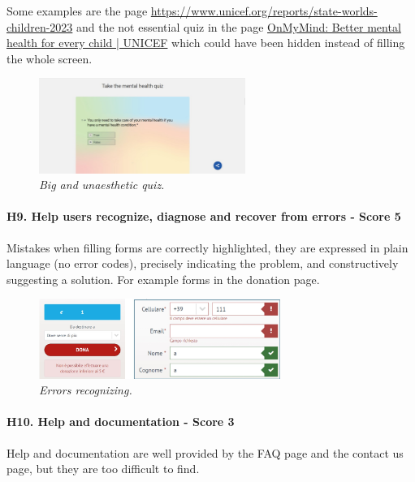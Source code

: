 \newline Some examples are the page \href{https://www.unicef.org/reports/state-worlds-children-2023}{https://www.unicef.org/reports/state-worlds-children-2023} and the not essential quiz in the page \href{https://www.unicef.org/on-my-mind}{OnMyMind: Better mental health for every child | UNICEF} which could have been hidden instead of filling the whole screen. 
\begin{figure}[!h]
	\begin{center}
		\includegraphics[width=0.6\textwidth]{FinalScores14.jpg}
		\captionsetup{font=small}
		\caption{\textit{Big and unaesthetic quiz.}}
	\end{center}
\end{figure}
\newline
\newline \paragraph{H9. Help users recognize, diagnose and recover from errors - Score 5} \label{subsec:H9}	Mistakes when filling forms are correctly highlighted, they are expressed in plain language (no error codes), precisely indicating the problem, and constructively suggesting a solution. For example forms in the donation page.
\begin{figure}[!h]
	\begin{center}
		\includegraphics[width=0.7\textwidth]{FinalScores15.jpg}
		\captionsetup{font=small}
		\caption{\textit{Errors recognizing.}}
	\end{center}
\end{figure}
\newline
\newline \paragraph{H10. Help and documentation - Score 3}  \label{subsec:H10}	Help and documentation are well provided by the FAQ page and the contact us page, but they are too difficult to find.
